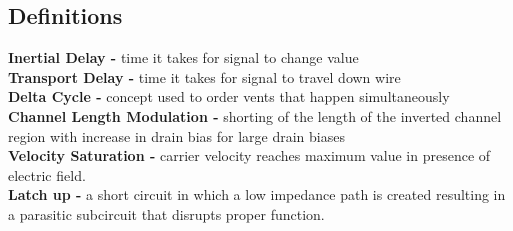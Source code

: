 \documentclass[10pt]{article}
\begin{document}
\begin{multicols}{3}
    \subsection*{Definitions}
    \textbf{Inertial Delay -} time it takes for signal to change value \\
    \textbf{Transport Delay -} time it takes for signal to travel down wire \\
    \textbf{Delta Cycle -} concept used to order vents that happen
    simultaneously \\
    \textbf{Channel Length Modulation -} shorting of the length of the inverted
    channel region with increase in drain bias for large drain biases \\
    \textbf{Velocity Saturation -} carrier velocity reaches maximum value in
    presence of electric field. \\
    \textbf{Latch up -} a short circuit in which a low impedance path is
    created resulting in a parasitic subcircuit that disrupts proper function.\\

\end{multicols}
\end{document}
